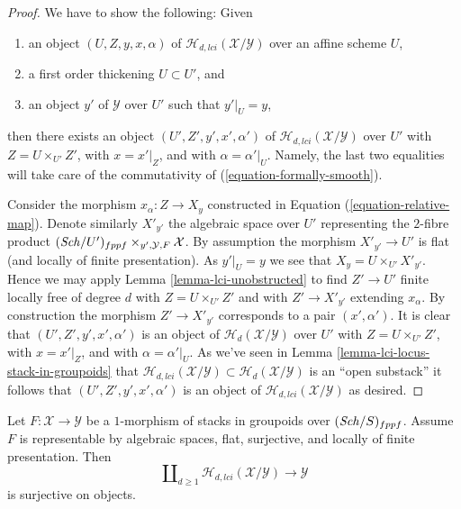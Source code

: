 \begin{proof}
We have to show the following: Given
\begin{enumerate}
\item an object $(U, Z, y, x, \alpha)$ of
$\mathcal{H}_{d, lci}(\mathcal{X}/\mathcal{Y})$ over an affine scheme $U$,
\item a first order thickening $U \subset U'$, and
\item an object $y'$ of $\mathcal{Y}$ over $U'$ such that $y'|_U = y$,
\end{enumerate}
then there exists an object $(U', Z', y', x', \alpha')$ of
$\mathcal{H}_{d, lci}(\mathcal{X}/\mathcal{Y})$ over $U'$ with
$Z = U \times_{U'} Z'$, with $x = x'|_Z$, and with
$\alpha = \alpha'|_U$. Namely, the last two equalities will take care
of the commutativity of (\ref{equation-formally-smooth}).

\medskip\noindent
Consider the morphism $x_\alpha : Z \to X_y$ constructed in
Equation (\ref{equation-relative-map}). Denote similarly $X'_{y'}$
the algebraic space over $U'$ representing the $2$-fibre product
$(\mathit{Sch}/U')_{fppf} \times_{y', \mathcal{Y}, F} \mathcal{X}$.
By assumption the morphism $X'_{y'} \to U'$ is flat (and locally of finite
presentation). As $y'|_U = y$ we see that $X_y = U \times_{U'} X'_{y'}$.
Hence we may apply
Lemma \ref{lemma-lci-unobstructed}
to find $Z' \to U'$ finite locally free of degree $d$ with
$Z = U \times_{U'} Z'$ and with $Z' \to X'_{y'}$ extending $x_\alpha$.
By construction the morphism $Z' \to X'_{y'}$ corresponds to a pair
$(x', \alpha')$. It is clear that $(U', Z', y', x', \alpha')$
is an object of $\mathcal{H}_d(\mathcal{X}/\mathcal{Y})$ over $U'$
with $Z = U \times_{U'} Z'$, with $x = x'|_Z$, and with
$\alpha = \alpha'|_U$. As we've seen in
Lemma \ref{lemma-lci-locus-stack-in-groupoids}
that $\mathcal{H}_{d, lci}(\mathcal{X}/\mathcal{Y}) \subset
\mathcal{H}_d(\mathcal{X}/\mathcal{Y})$ is an ``open substack''
it follows that $(U', Z', y', x', \alpha')$ is an object of
$\mathcal{H}_{d, lci}(\mathcal{X}/\mathcal{Y})$ as desired.
\end{proof}

\begin{lemma}
\label{lemma-lci-surjective}
Let $F : \mathcal{X} \to \mathcal{Y}$ be a $1$-morphism of stacks in groupoids
over $(\mathit{Sch}/S)_{fppf}$. Assume $F$ is representable by algebraic
spaces, flat, surjective, and locally of finite presentation. Then
$$
\coprod\nolimits_{d \geq 1} \mathcal{H}_{d, lci}(\mathcal{X}/\mathcal{Y})
\longrightarrow
\mathcal{Y}
$$
is surjective on objects.
\end{lemma}

